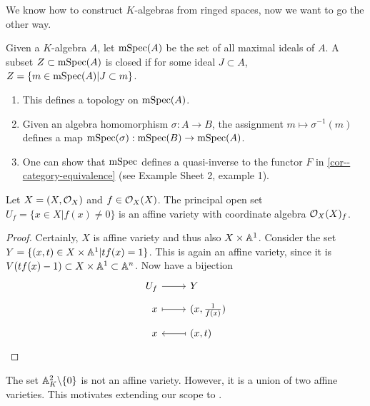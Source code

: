\documentclass[a4paper,11pt]{article}
\begin{document}
			We know how to construct $K$-algebras from ringed spaces, now we want to go the other way.

			\begin{defi}
				Given a $K$-algebra $A$, let $\msp(A)$ be the set of all maximal ideals of $A$. A subset $Z\subset\msp(A)$ is closed if for some ideal $J\subset A$, $Z=\{m\in\msp(A)|J\subset m\}$.
			\end{defi}

			\begin{remark}
				\begin{enumerate}
					\item This defines a topology on $\msp(A)$.
					\item Given an algebra homomorphism $\sigma:A\rightarrow B$, the assignment $m\mapsto\sigma^{-1}(m)$ defines a map $\msp(\sigma):\msp(B)\rightarrow\msp(A)$.
					\item One can show that $\msp$ defines a quasi-inverse to the functor $F$ in \autoref{cor--category-equivalence} (see Example Sheet 2, example 1).
				\end{enumerate}
			\end{remark}

			\begin{prop}
				Let $X=(X,\O_X)$ and $f\in\O_X(X)$. The principal open set $U_f=\{x\in X|f(x)\neq0\}$ is an affine variety with coordinate algebra $\O_X(X)_f$.
			\end{prop}
			\begin{proof}
				Certainly, $X$ is affine variety and thus also $X\times\AA^1$. Consider the set $Y=\{(x,t)\in X\times\AA^1|tf(x)=1\}$. This is again an affine variety, since it is $V(tf(x)-1)\subset X\times\AA^1\subset\AA^n$. Now have a bijection
				\begin{equation*}
						\begin{tikzcd}[row sep=tiny,
							/tikz/column 1/.append style={nodes={anchor=base east}},
							/tikz/column 2/.append style={nodes={anchor=base west}}]
							U_f\ar[r] & Y\\
							x\ar[r,mapsto] & (x,\frac{1}{f(x)})\\
							x & \ar[l,mapsto](x,t)
						\end{tikzcd}
				\end{equation*}
			\end{proof}

			\begin{eg}
				The set $\AA^2_K\backslash\{0\}$ is not an affine variety. However, it is a union of two affine varieties. This motivates extending our scope to .
			\end{eg}
\end{document}
